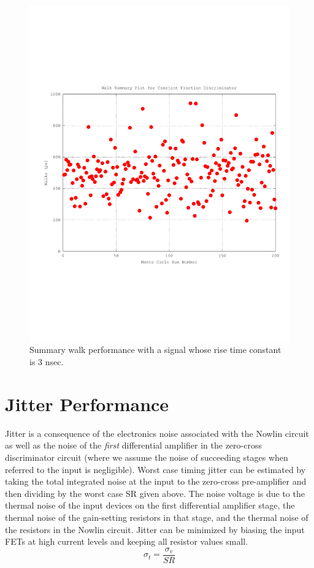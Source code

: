 \documentclass[12pt,oneside,final]{siuethesis}
\theoremstyle{definition}
\begin{document}
\begin{figure}[htbp!]
	\centering
 	\includegraphics[scale=0.7,keepaspectratio=true]{../Design_Reports/CFD_circuit_report/images/summary_walk.pdf} 	
 	\caption{Summary walk performance with a signal whose rise time constant is 3 nsec.}
 	\label{FIG:SUMMARY_WALK}
\end{figure}

\section{Jitter Performance}
\par Jitter is a consequence of the electronics noise associated with the Nowlin circuit as well as the noise of the \emph{first} differential amplifier in the zero-cross discriminator circuit (where we assume the noise of succeeding stages when referred to the input is negligible). Worst case timing jitter can be estimated by taking the total integrated noise at the input to the zero-cross pre-amplifier and then dividing by the worst case SR given above.  The noise voltage is due to the thermal noise of the input devices on the first differential amplifier stage, the thermal noise of the gain-setting resistors in that stage, and the thermal noise of the resistors in the Nowlin circuit.  Jitter can be minimized by biasing the input FETs at high current levels and keeping all resistor values small.
\begin{equation}
\sigma_t = \frac{\sigma_v}{SR}
\end{equation}
\end{document}
